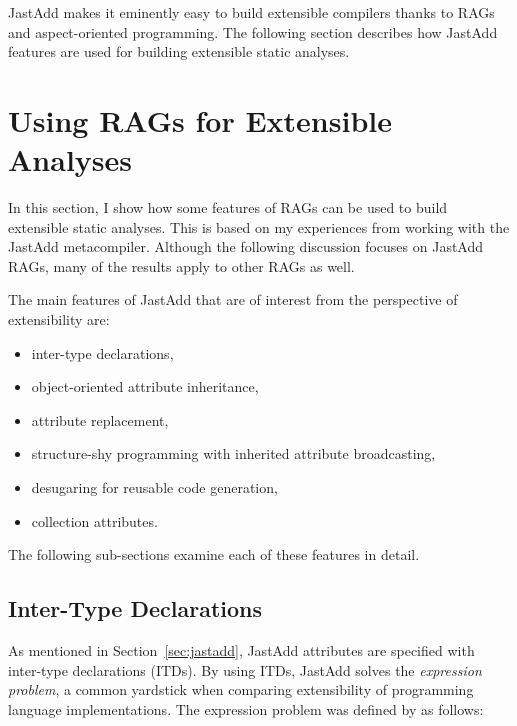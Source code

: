 \documentclass[10pt, twoside, openright]{book}
\newcommand{\secref}[1]{Section~\ref{#1}}
\begin{document}
JastAdd makes it eminently easy to build extensible compilers thanks to RAGs and aspect-oriented
programming. The following section describes how JastAdd features are used for building
extensible static analyses.



\section{Using RAGs for Extensible Analyses}
\label{sec:extension-mechanisms}

In this section, I show how some features of RAGs
can be used to build extensible static analyses.
This is based on my experiences from working with the JastAdd metacompiler.
Although the following discussion focuses on JastAdd RAGs, many of
the results apply to other RAGs as well.

The main features of JastAdd that are of interest from the perspective of extensibility are:

\begin{itemize}
  \item inter-type declarations,
  \item object-oriented attribute inheritance,
  \item attribute replacement,
  \item structure-shy programming with inherited attribute broadcasting,
  \item desugaring for reusable code generation,
  \item collection attributes.
\end{itemize}

\noindent
The following sub-sections examine each of these features in detail.


\subsection{Inter-Type Declarations}

As mentioned in \secref{sec:jastadd}, JastAdd attributes are specified with
inter-type declarations (ITDs).
By using ITDs, JastAdd solves the \emph{expression problem}, a common
yardstick when comparing extensibility of programming language implementations.
The expression problem was defined by \textcite{expressionproblem} as follows:
\end{document}
